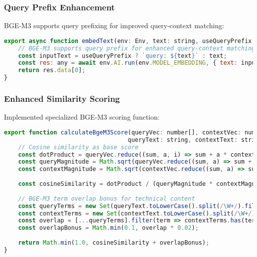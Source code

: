 \documentclass[12pt,a4paper]{article}
\begin{document}
\subsubsection{Query Prefix Enhancement}
BGE-M3 supports query prefixing for improved query-context matching:

\begin{lstlisting}[language=javascript, caption=BGE-M3 Query Prefix Implementation]
export async function embedText(env: Env, text: string, useQueryPrefix: boolean = false): Promise<number[]> {
    // BGE-M3 supports query prefix for enhanced query-context matching
    const inputText = useQueryPrefix ? `query: ${text}` : text;
    const res: any = await env.AI.run(env.MODEL_EMBEDDING, { text: inputText });
    return res.data[0];
}
\end{lstlisting}

\subsubsection{Enhanced Similarity Scoring}
Implemented specialized BGE-M3 scoring function:

\begin{lstlisting}[language=javascript, caption=BGE-M3 Enhanced Scoring]
export function calculateBgeM3Score(queryVec: number[], contextVec: number[], 
                                   queryText: string, contextText: string): number {
    // Cosine similarity as base score
    const dotProduct = queryVec.reduce((sum, a, i) => sum + a * contextVec[i], 0);
    const queryMagnitude = Math.sqrt(queryVec.reduce((sum, a) => sum + a * a, 0));
    const contextMagnitude = Math.sqrt(contextVec.reduce((sum, a) => sum + a * a, 0));
    
    const cosineSimilarity = dotProduct / (queryMagnitude * contextMagnitude);
    
    // BGE-M3 term overlap bonus for technical content
    const queryTerms = new Set(queryText.toLowerCase().split(/\W+/).filter(t => t.length > 2));
    const contextTerms = new Set(contextText.toLowerCase().split(/\W+/).filter(t => t.length > 2));
    const overlap = [...queryTerms].filter(term => contextTerms.has(term)).length;
    const overlapBonus = Math.min(0.1, overlap * 0.02);
    
    return Math.min(1.0, cosineSimilarity + overlapBonus);
}
\end{lstlisting}
\end{document}
